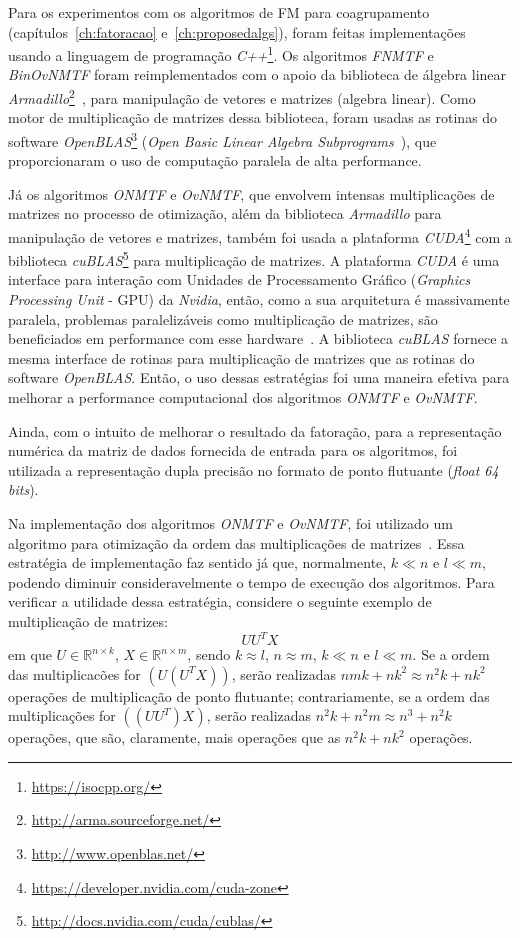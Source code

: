 \documentclass[
    12pt,                %
    oneside,            %
    a4paper,            %
    english,            %
    brazil                %
    ]{abntex2ppgsi}
\begin{document}
Para os experimentos com os algoritmos de FM para coagrupamento (capítulos~\ref{ch:fatoracao} e~\ref{ch:proposedalgs}), foram feitas implementações usando a linguagem de programação \textit{C++}\footnote{\url{https://isocpp.org/}}.
Os algoritmos \textit{FNMTF} e \textit{BinOvNMTF} foram reimplementados com o apoio da biblioteca de álgebra linear \textit{Armadillo}\footnote{\url{http://arma.sourceforge.net/}}~\cite{armadillo}, para manipulação de vetores e matrizes (algebra linear). Como motor de multiplicação de matrizes dessa biblioteca, foram usadas as rotinas do software \textit{OpenBLAS}\footnote{\url{http://www.openblas.net/}} (\textit{Open Basic Linear Algebra Subprograms}~\cite{openblas}), que proporcionaram o uso de computação paralela de alta performance. %

Já os algoritmos \textit{ONMTF} e \textit{OvNMTF}, que envolvem intensas multiplicações de matrizes no processo de otimização, além da biblioteca \textit{Armadillo} para manipulação de vetores e matrizes, também foi usada a plataforma \textit{CUDA}\footnote{\url{https://developer.nvidia.com/cuda-zone}} com a biblioteca \textit{cuBLAS}\footnote{\url{http://docs.nvidia.com/cuda/cublas/}} para multiplicação de matrizes.
A plataforma \textit{CUDA} é uma interface para interação com Unidades de Processamento Gráfico (\textit{Graphics Processing Unit} - GPU) da \textit{Nvidia}, então, como a sua arquitetura é massivamente paralela, problemas paralelizáveis como multiplicação de matrizes, são beneficiados em performance com esse hardware~\cite{Fatahalian2004}.
A biblioteca \textit{cuBLAS} fornece a mesma interface de rotinas para multiplicação de matrizes que as rotinas do software \textit{OpenBLAS}.
Então, o uso dessas estratégias foi uma maneira efetiva para melhorar a performance computacional dos algoritmos \textit{ONMTF} e \textit{OvNMTF}.

Ainda, com o intuito de melhorar o resultado da fatoração, para a representação numérica da matriz de dados fornecida de entrada para os algoritmos, foi utilizada a representação dupla precisão no formato de ponto flutuante (\textit{float 64 bits}).

Na implementação dos algoritmos \textit{ONMTF} e \textit{OvNMTF}, foi utilizado um algoritmo para otimização da ordem das multiplicações de matrizes~\cite{Cormen2001}.
Essa estratégia de implementação faz sentido já que, normalmente, $k \ll n$ e $l \ll m$, podendo diminuir consideravelmente o tempo de execução dos algoritmos.
Para verificar a utilidade dessa estratégia, considere o seguinte exemplo de multiplicação de matrizes:
\[
    U U^T X
\]
em que $U \in \mathbb{R}^{n \times k}$, $X \in \mathbb{R}^{n \times m}$, sendo $k \approx l$, $n \approx m$, $k \ll n$ e $l \ll m$.
Se a ordem das multiplicacões for $(U (U^T X))$, serão realizadas $nmk + nk^2 \approx n^2k + nk^2$ operações de multiplicação de ponto flutuante; contrariamente, se a ordem das multiplicações for $((U U^T) X)$, serão realizadas $n^2k + n^2m \approx n^3 + n^2k$ operações, que são, claramente, mais operações que as $n^2k + nk^2$ operações.
\end{document}
